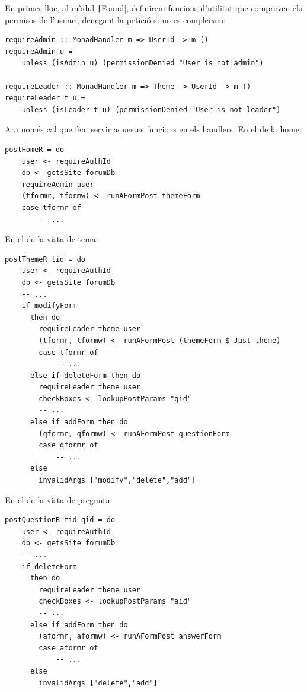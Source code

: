\documentclass[catalan, a4paper]{scrartcl}
\begin{document}
En primer lloc, al mòdul \texttt|Found|, definirem funcions
d'utilitat que comproven els permisos de l'usuari, denegant la petició si
no es compleixen:

\begin{verbatim}
requireAdmin :: MonadHandler m => UserId -> m ()
requireAdmin u =
    unless (isAdmin u) (permissionDenied "User is not admin")

requireLeader :: MonadHandler m => Theme -> UserId -> m ()
requireLeader t u =
    unless (isLeader t u) (permissionDenied "User is not leader")
\end{verbatim}

Ara només cal que fem servir aquestes funcions en els handlers.
En el de la home:

\begin{verbatim}
postHomeR = do
    user <- requireAuthId
    db <- getsSite forumDb
    requireAdmin user
    (tformr, tformw) <- runAFormPost themeForm
    case tformr of
        -- ...
\end{verbatim}

En el de la vista de tema:

\begin{verbatim}
postThemeR tid = do
    user <- requireAuthId
    db <- getsSite forumDb
    -- ...
    if modifyForm
      then do
        requireLeader theme user
        (tformr, tformw) <- runAFormPost (themeForm $ Just theme)
        case tformr of
            -- ...
      else if deleteForm then do
        requireLeader theme user
        checkBoxes <- lookupPostParams "qid"
        -- ...
      else if addForm then do
        (qformr, qformw) <- runAFormPost questionForm
        case qformr of
            -- ...
      else
        invalidArgs ["modify","delete","add"]
\end{verbatim}

En el de la vista de pregunta:

\begin{verbatim}
postQuestionR tid qid = do
    user <- requireAuthId
    db <- getsSite forumDb
    -- ...
    if deleteForm
      then do
        requireLeader theme user
        checkBoxes <- lookupPostParams "aid"
        -- ...
      else if addForm then do
        (aformr, aformw) <- runAFormPost answerForm
        case aformr of
            -- ...
      else
        invalidArgs ["delete","add"]
\end{verbatim}
\end{document}

